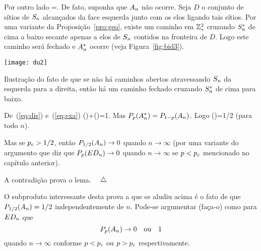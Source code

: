 Por outro lado
\beq
\label{eq:exa}
\an\cup\asn=\Omega.
\eeq
De fato, suponha que $A_n$ não ocorre. Seja $D$ o conjunto de sítios de $S_n$
alcançados da face esquerda junto com os elos ligando tais sítios.
Por uma variante da Proposição~\ref{pro:geo}, existe um caminho em
$\mathbb{Z}^2_\ast$ cruzando $S_n^\ast$ de cima a baixo secante apenas a elos de $S_n$ contidos
na fronteira de $D$. Logo este caminho será fechado e $A_n^\ast$ ocorre (veja
Figura~\ref{fig:bid3}).

\bef
%
\texttt{[image: du2]}
\caption{Ilustração do fato de que se não há caminhos abertos atravessando 
  $S_n$ da esquerda para a
  direita, então há um caminho fechado cruzando $S_n^\ast$ de cima para baixo.}
\label{fig:bid3}
\eef

De~(\ref{eq:dis}) e~(\ref{eq:exa})
\beq
\p(\an)+\p(\asn)=1.
\eeq
Mas $P_p(A_n^\ast)=P_{1-p}(A_n)$. Logo
\beq
\ph(\an)=1/2
\eeq
(para todo $n$).

Mas se $p_c>1/2$, então $P_{1/2}(A_n)\to0$ quando $n\to\infty$
(por uma variante do argumento que diz que $P_p(ED_n)\to0$
quando $n\to\infty$ se $p<p_c$ mencionado no capítulo anterior).

A contradição prova o lema. $\quad\triangle$

\vs

O subproduto interessante desta prova a que se aludiu acima é o fato
de que $P_{1/2}(A_n)=1/2$ independentemente de $n$.
Pode-se argumentar (faça-o) como para $ED_n$ que 
$$P_p(A_n)\to 0\quad\mbox{ou}\quad 1$$
quando $n\to\infty$ conforme $p<p_c$ ou $p>p_c$ respectivamente.





